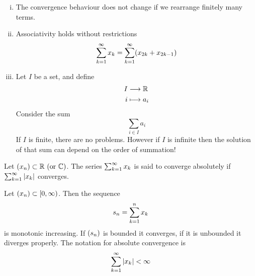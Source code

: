 \documentclass[../../script.tex]{subfiles}
\begin{document}
\begin{rem}\leavevmode
\begin{enumerate}[(i)]
	\item The convergence behaviour does not change if we rearrange finitely many terms.
	
	\item Associativity holds without restrictions
	\[
		\series{k} x_k = \series{k} (x_{2k} + x_{2k-1})
	\]
	
	\item Let $I$ be a set, and define
	\begin{align*}
		I &\longrightarrow \realn \\
		i &\longmapsto a_i
	\end{align*}
	Consider the sum
	\[
		\sum_{i \in I} a_i	
	\]
	If $I$ is finite, there are no problems. However if $I$ is infinite then the solution of that sum can depend on the order of summation!
\end{enumerate}
\end{rem}

\begin{defi}
Let $\rcseqdef{x}$. The series $\series{k} x_k$ is said to converge absolutely if $\series{k} |x_k|$ converges.
\end{defi}

\begin{rem}
Let $\seq{x} \subset [0, \infty)$. Then the sequence
\[
	s_n = \series[n]{k} x_k
\]
is monotonic increasing. If $\seq{s}$ is bounded it converges, if it is unbounded it diverges properly. The notation for absolute convergence is
\[
	\series{k} |x_k| < \infty
\]
\end{rem}
\end{document}
